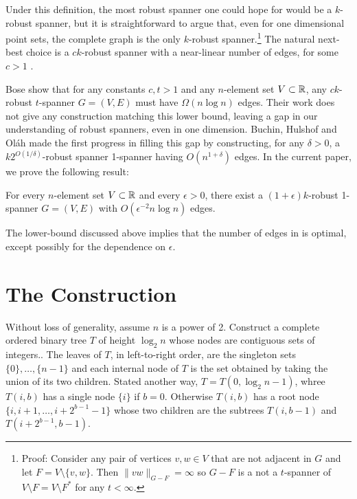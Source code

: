 \documentclass{patmorin}
\begin{document}
Under this definition, the most robust spanner one could hope for
would be a $k$-robust spanner, but it is straightforward to argue
that, even for one dimensional point sets, the complete graph is the
only $k$-robust spanner.\footnote{Proof: Consider any pair of vertices
$v,w\in V$ that are not adjacent in $G$ and let $F=V\setminus\{v,w\}$.
Then $\|vw\|_{G-F}=\infty$ so $G-F$ is a not a $t$-spanner of $V\setminus
F=V\setminus F^*$ for any $t<\infty$.} The natural next-best choice is a
$ck$-robust spanner with a near-linear number of edges, for some $c>1$ .

Bose \etal \cite[Theorem~3]{bose.dujmovic.ea:robust} show that for any
constants $c,t>1$ and any $n$-element set $V\subset\mathbb{R}$, any $ck$-robust
$t$-spanner $G=(V,E)$ must have $\Omega(n\log n)$ edges.  Their work
does not give any construction matching this lower bound, leaving a
gap in our understanding of robust spanners, even in one dimension.
Buchin, Hulshof and Ol\'ah \cite{buchin.hulshof.olah:robust} made the
first progress in filling this gap by constructing, for any $\delta>0$,
a $k2^{O(1/\delta)}$-robust spanner 1-spanner having $O(n^{1+\delta})$
edges.  In the current paper, we prove the following result:

\begin{thm}
  For every $n$-element set $V\subset\mathbb{R}$ and every $\epsilon>0$,
  there exist a $(1+\epsilon)k$-robust 1-spanner $G=(V,E)$ with
  $O(\epsilon^{-2}n\log n)$ edges.
\end{thm}

The lower-bound discussed above implies that the number of edges
in  is optimal, except possibly for the dependence on
$\epsilon$.


\section{The Construction}


Without loss of generality, assume $n$ is a power of 2.  Construct a
complete ordered binary tree $T$ of height $\log_2 n$ whose nodes are
contiguous sets of integers..  The leaves of $T$, in left-to-right order,
are the singleton sets $\{0\},\ldots,\{n-1\}$ and each internal node of
$T$ is the set obtained by taking the union of its two children.  Stated
another way, $T=T(0,\log_2 n-1)$, whree $T(i,b)$ has a single node $\{i\}$
if $b=0$. Otherwise $T(i,b)$ has a root node $\{i,i+1,\ldots,i+2^{b-1}-1\}$
whose two children are the subtrees $T(i,b-1)$ and $T(i+2^{b-1}, b-1)$.
\end{document}
